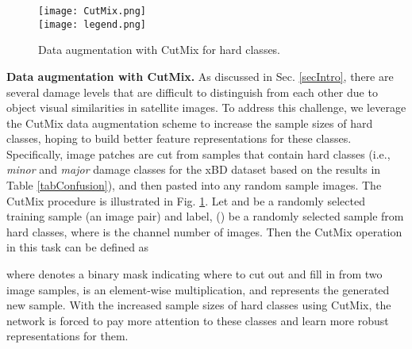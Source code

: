 \documentclass{article}
\begin{document}
\begin{figure}
  \centering
  \texttt{[image: CutMix.png]} \\
   \texttt{[image: legend.png]}
  \caption{Data augmentation with CutMix for hard classes.}
  \vspace{-0.1cm}
  \label{figCutmix}
\end{figure}

\textbf{Data augmentation with CutMix.} 
As discussed in Sec. \ref{secIntro}, there are several damage levels that are difficult to distinguish from each other due to object visual similarities in satellite images. To address this challenge, we leverage the CutMix data augmentation scheme to increase the sample sizes of hard classes, hoping to build better feature representations for these classes.  
Specifically, image patches are cut from samples that contain hard classes (i.e., \textit{minor} and \textit{major} damage classes for the xBD dataset based on the results in Table \ref{tabConfusion}), and then pasted into any random sample images. The CutMix procedure is illustrated in Fig. \ref{figCutmix}. Let  and  be a randomly selected training sample (an image pair) and label, () be a randomly selected sample from hard classes, where  is the channel number of images. Then the CutMix operation in this task can be defined as

where  denotes a binary mask indicating where to cut out and fill in from two image samples,  is an element-wise multiplication, and  represents the generated new sample. With the increased sample sizes of hard classes using CutMix, the network is forced to pay more attention to these classes and learn more robust representations for them.
\end{document}

